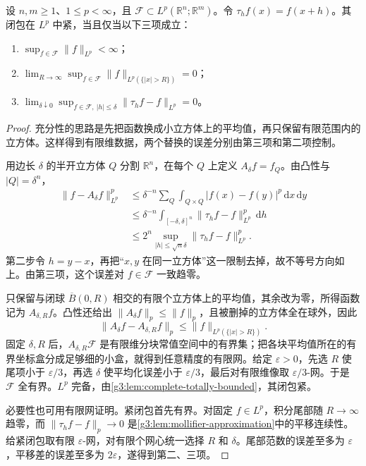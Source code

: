 \begin{theorem}\label{g3:thm:lp-translation-compactness}
	设 \(n,m\ge1\)、\(1\le p<\infty\)，且 \(\mathcal F\subset L^p(\mathbb R^n;\mathbb R^m)\)。令 \(\tau_h f(x)=f(x+h)\)。其闭包在 \(L^p\) 中紧，当且仅当以下三项成立：
	\begin{enumerate}
		\item \(\sup_{f\in\mathcal F}\|f\|_{L^p}<\infty\)；
		\item \(\displaystyle\lim_{R\to\infty}\sup_{f\in\mathcal F}\|f\|_{L^p(\{|x|>R\})}=0\)；
		\item \(\displaystyle\lim_{\delta\downarrow0}\sup_{f\in\mathcal F,\ |h|\le\delta}\|\tau_hf-f\|_{L^p}=0\)。
	\end{enumerate}
\end{theorem}
\begin{proof}
	充分性的思路是先把函数换成小立方体上的平均值，再只保留有限范围内的立方体。这样得到有限维数据，两个替换的误差分别由第三项和第二项控制。

	用边长 \(\delta\) 的半开立方体 \(Q\) 分割 \(\mathbb R^n\)，在每个 \(Q\) 上定义 \(A_\delta f=f_Q\)。由凸性与 \(|Q|=\delta^n\)，
	\[
	\begin{aligned}
		\|f-A_\delta f\|_{L^p}^p
		&\le\delta^{-n}\sum_Q\int_{Q\times Q}|f(x)-f(y)|^p\,\mathrm dx\,\mathrm dy\\
		&\le\delta^{-n}\int_{[-\delta,\delta]^n}\|\tau_hf-f\|_{L^p}^p\,\mathrm dh\\
		&\le2^n\sup_{|h|\le\sqrt n\delta}\|\tau_hf-f\|_{L^p}^p.
	\end{aligned}
	\]
	第二步令 \(h=y-x\)，再把“\(x,y\) 在同一立方体”这一限制去掉，故不等号方向如上。由第三项，这个误差对 \(f\in\mathcal F\) 一致趋零。

	只保留与闭球 \(\overline B(0,R)\) 相交的有限个立方体上的平均值，其余改为零，所得函数记为 \(A_{\delta,R}f\)。凸性还给出 \(\|A_\delta f\|_p\le\|f\|_p\)，且被删掉的立方体全在球外，因此
	\[
		\|A_\delta f-A_{\delta,R}f\|_p
		\le\|f\|_{L^p(\{|x|>R\})}.
	\]
	固定 \(\delta,R\) 后，\(A_{\delta,R}\mathcal F\) 是有限维分块常值空间中的有界集；把各块平均值所在的有界坐标盒分成足够细的小盒，就得到任意精度的有限网。给定 \(\varepsilon>0\)，先选 \(R\) 使尾项小于 \(\varepsilon/3\)，再选 \(\delta\) 使平均化误差小于 \(\varepsilon/3\)，最后对有限维像取 \(\varepsilon/3\)-网。于是 \(\mathcal F\) 全有界。\(L^p\) 完备，由\cref{g3:lem:complete-totally-bounded}，其闭包紧。

	必要性也可用有限网证明。紧闭包首先有界。对固定 \(f\in L^p\)，积分尾部随 \(R\to\infty\) 趋零，而 \(\|\tau_hf-f\|_p\to0\) 是\cref{g3:lem:mollifier-approximation}中的平移连续性。给紧闭包取有限 \(\varepsilon\)-网，对有限个网心统一选择 \(R\) 和 \(\delta\)。尾部范数的误差至多为 \(\varepsilon\)，平移差的误差至多为 \(2\varepsilon\)，遂得到第二、三项。
\end{proof}

